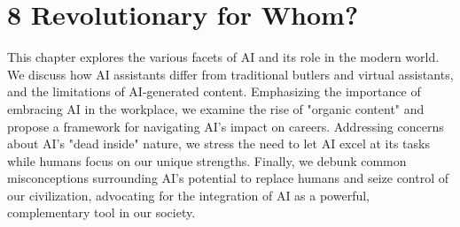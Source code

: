 \section*{8 Revolutionary for Whom?}

This chapter explores the various facets of AI and its role in the modern world. We discuss how AI assistants differ from traditional butlers and virtual assistants, and the limitations of AI-generated content. Emphasizing the importance of embracing AI in the workplace, we examine the rise of "organic content" and propose a framework for navigating AI's impact on careers. Addressing concerns about AI's "dead inside" nature, we stress the need to let AI excel at its tasks while humans focus on our unique strengths. Finally, we debunk common misconceptions surrounding AI's potential to replace humans and seize control of our civilization, advocating for the integration of AI as a powerful, complementary tool in our society.
